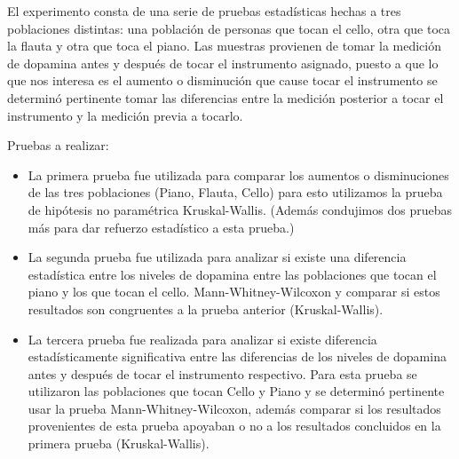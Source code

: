 El experimento consta de una serie de pruebas estadísticas hechas a tres poblaciones distintas: una población de personas que tocan el cello, otra que toca la flauta y otra que toca el piano. Las muestras provienen de tomar la medición de dopamina antes y después de tocar el instrumento asignado, puesto a que lo que nos interesa es el aumento o disminución que cause tocar el instrumento se determinó pertinente tomar las diferencias entre la medición posterior a tocar el instrumento y la medición previa a tocarlo.


Pruebas a realizar: 
\begin{itemize}
    \item La primera prueba fue utilizada para comparar los aumentos o disminuciones de las tres poblaciones (Piano, Flauta, Cello) para esto utilizamos la prueba de hipótesis no paramétrica Kruskal-Wallis. (Además condujimos dos pruebas más para dar refuerzo estadístico a esta prueba.)
    \item La segunda prueba fue utilizada para analizar si existe una diferencia estadística entre los niveles de dopamina entre las poblaciones que tocan el piano y los que tocan el cello. Mann-Whitney-Wilcoxon y comparar si estos resultados son congruentes a la prueba anterior (Kruskal-Wallis).
    \item La tercera prueba fue realizada para analizar si existe diferencia estadísticamente significativa entre las diferencias de los niveles de dopamina antes y después de tocar el instrumento respectivo. Para esta prueba se utilizaron las poblaciones que tocan Cello y Piano y se determinó pertinente usar la prueba Mann-Whitney-Wilcoxon, además comparar si los resultados provenientes de esta prueba apoyaban o no a los resultados concluidos en la primera prueba (Kruskal-Wallis).
\end{itemize}
